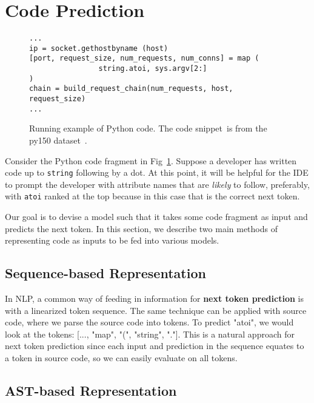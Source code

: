 \documentclass[nonacm, sigconf]{acmart}
\begin{document}
\section{Code Prediction}
\label{sec:problem}

\begin{figure}
\lstset{basicstyle=\footnotesize\ttfamily}
\begin{lstlisting}
...
ip = socket.gethostbyname (host)
[port, request_size, num_requests, num_conns] = map (
                string.atoi, sys.argv[2:]
)
chain = build_request_chain(num_requests, host, request_size)
...
\end{lstlisting}
    \caption{Running example of Python code. 
    The code snippet~\protect\footnotemark is from the py150 dataset~\cite{py150}.
    }
    \label{fig:examplecode}
\end{figure}

Consider the Python code fragment in Fig~\ref{fig:examplecode}.  Suppose a developer has written code up to \texttt{string} following by a dot.  At this point, it will be helpful for the IDE to prompt the developer with attribute names that are \textit{likely} to follow, preferably, with \texttt{atoi} ranked at the top because in this case that is the correct next token.

Our goal is to devise a model such that it takes some code fragment as input and predicts the next token. In this section, we describe two main methods of representing code as inputs to be fed into various models.

\subsection{Sequence-based Representation}
In NLP, a common way of feeding in information for \textbf{next token prediction} is with a linearized token sequence. The same technique can be applied with source code, where we parse the source code into tokens. To predict "atoi", we would look at the tokens: [..., "map", "(", "string", "."]. This is a natural approach for next token prediction since each input and prediction in the sequence equates to a token in source code, so we can easily evaluate on all tokens.

\subsection{AST-based Representation}
\end{document}
